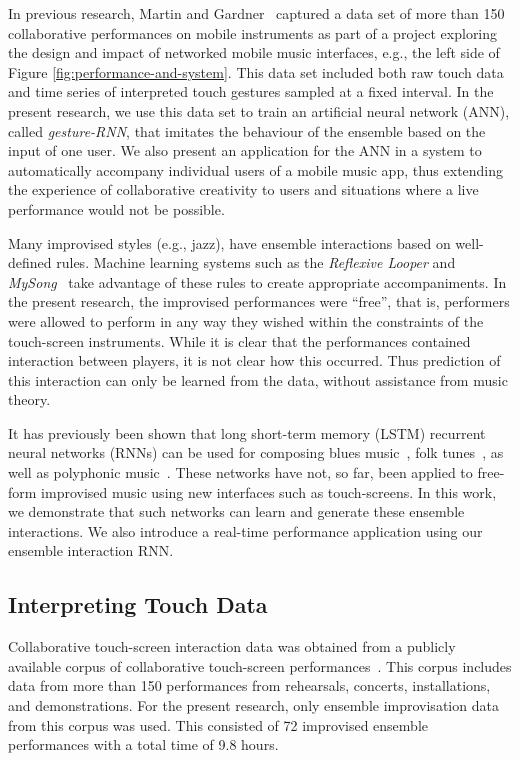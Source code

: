 \documentclass[sigchi]{acmart} %
\begin{document}
In previous research, Martin and Gardner~\cite{Martin:2016rm} captured a
data set of more than 150 collaborative performances on mobile
instruments as part of a project exploring the design and impact of
networked mobile music interfaces, e.g., the left side of Figure
\ref{fig:performance-and-system}. This data set included both raw
touch data and time series of interpreted touch gestures sampled at a
fixed interval. In the present research, we use this data set to train
an artificial neural network (ANN), called \emph{gesture-RNN}, that imitates the
behaviour of the ensemble based on the input of one user. We also
present an application for the ANN in a system to automatically
accompany individual users of a mobile music app, thus extending the
experience of collaborative creativity to users and situations where a
live performance would not be possible.

Many improvised styles (e.g., jazz), have ensemble interactions based
on well-defined rules. Machine learning systems such as the
\emph{Reflexive Looper}\cite{Pachet:2013kq} and
\emph{MySong}~\cite{Simon:2008dp} take advantage of these rules to
create appropriate accompaniments. In the present research, the
improvised performances were ``free'', that is, performers were
allowed to perform in any way they wished within the constraints of
the touch-screen instruments. While it is clear that the performances
contained interaction between players, it is not clear how this
occurred. Thus prediction of this interaction can only be learned from
the data, without assistance from music theory.

It has previously been shown that long short-term memory (LSTM)
recurrent neural networks (RNNs) can be used for composing blues
music~\cite{Eck:2007rw}, folk tunes~\cite{Sturm:2016rz}, as well as
polyphonic music~\cite{Walder:2016aa}. These networks have not, so
far, been applied to free-form improvised music using new interfaces
such as touch-screens. In this work, we demonstrate that such networks
can learn and generate these ensemble interactions. We also introduce
a real-time performance application using our ensemble interaction
RNN.

\subsection{Interpreting Touch Data}

Collaborative touch-screen interaction data was obtained from a
publicly available corpus of collaborative touch-screen
performances~\cite{Martin:2016fc}. This corpus includes data from more
than 150 performances from rehearsals, concerts, installations, and
demonstrations. For the present research, only ensemble improvisation
data from this corpus was used. This consisted of 72 improvised
ensemble performances with a total time of 9.8 hours.
\end{document}

